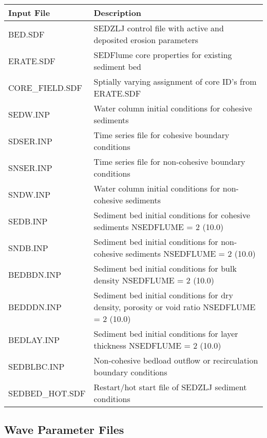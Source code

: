 \documentclass[letterpaper,10pt,english]{sphinxmanual}
\begin{document}
\begin{savenotes}\sphinxattablestart
\centering
\begin{tabulary}{\linewidth}[t]{|T|T|}
\hline
\sphinxstyletheadfamily 
Input File
&\sphinxstyletheadfamily 
Description
\\
\hline
BED.SDF
&
SEDZLJ control file with active and deposited erosion parameters
\\
\hline
ERATE.SDF
&
SEDFlume core properties for existing sediment bed
\\
\hline
CORE\_FIELD.SDF
&
Sptially varying assignment of core ID’s from ERATE.SDF
\\
\hline
SEDW.INP
&
Water column initial conditions for cohesive sediments
\\
\hline
SDSER.INP
&
Time series file for cohesive boundary conditions
\\
\hline
SNSER.INP
&
Time series file for non-cohesive boundary conditions
\\
\hline
SNDW.INP
&
Water column initial conditions for non-cohesive sediments
\\
\hline
SEDB.INP
&
Sediment bed initial conditions for cohesive sediments NSEDFLUME = 2 (10.0)
\\
\hline
SNDB.INP
&
Sediment bed initial conditions for non-cohesive sediments NSEDFLUME = 2 (10.0)
\\
\hline
BEDBDN.INP
&
Sediment bed initial conditions for bulk density NSEDFLUME = 2 (10.0)
\\
\hline
BEDDDN.INP
&
Sediment bed initial conditions for dry density, porosity or void ratio NSEDFLUME = 2 (10.0)
\\
\hline
BEDLAY.INP
&
Sediment bed initial conditions for layer thickness NSEDFLUME = 2 (10.0)
\\
\hline
SEDBLBC.INP
&
Non-cohesive bedload outflow or recirculation boundary conditions
\\
\hline
SEDBED\_HOT.SDF
&
Restart/hot start file of SEDZLJ sediment conditions
\\
\hline
\end{tabulary}
\par
\sphinxattableend\end{savenotes}


\subsection{Wave Parameter Files}
\label{\detokenize{inputfiles/waves:wave-parameter-files}}\label{\detokenize{inputfiles/waves:waves}}\label{\detokenize{inputfiles/waves::doc}}
\end{document}
